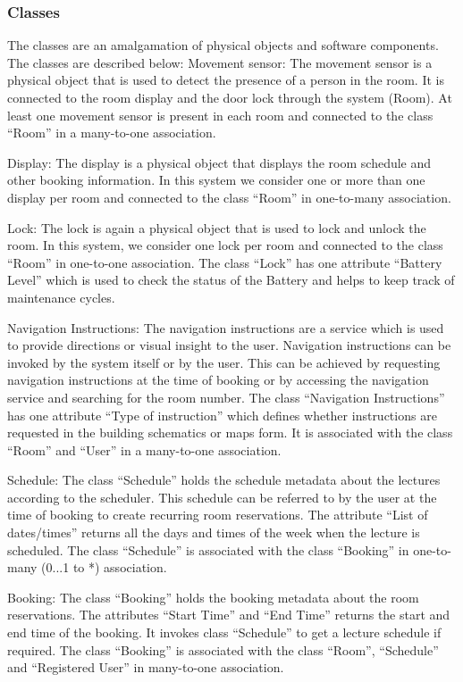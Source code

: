 \documentclass[conference,onecolumn]{IEEEtran}
\begin{document}
	\subsubsection*{Classes}
		The classes are an amalgamation of physical objects and software components. The classes are described below:
		Movement sensor: The movement sensor is a physical object that is used to detect the presence of a person in the room. It is connected to the room display and the door lock through the system (Room). At least one movement sensor is present in each room and connected to the class ``Room'' in a many-to-one association.
		
		Display: The display is a physical object that displays the room schedule and other booking information. In this system we consider one or more than one display per room and connected to the class ``Room'' in one-to-many association.

		Lock: The lock is again a physical object that is used to lock and unlock the room. In this system, we consider one lock per room and connected to the class ``Room'' in one-to-one association. The class ``Lock'' has one attribute ``Battery Level'' which is used to check the status of the Battery and helps to keep track of maintenance cycles.

		Navigation Instructions: The navigation instructions are a service which is used to provide directions or visual insight to the user. Navigation instructions can be invoked by the system itself or by the user. This can be achieved by requesting navigation instructions at the time of booking or by accessing the navigation service and searching for the room number. The class ``Navigation Instructions'' has one attribute ``Type of instruction'' which defines whether instructions are requested in the building schematics or maps form. It is associated with the class ``Room'' and ``User'' in a many-to-one association.

		Schedule: The class ``Schedule'' holds the schedule metadata about the lectures according to the scheduler. This schedule can be referred to by the user at the time of booking to create recurring room reservations. The attribute ``List of dates/times'' returns all the days and times of the week when the lecture is scheduled. The class ``Schedule'' is associated with the class ``Booking'' in one-to-many (0...1 to *) association.

		Booking: The class ``Booking'' holds the booking metadata about the room reservations. The attributes ``Start Time'' and ``End Time'' returns the start and end time of the booking. It invokes class ``Schedule'' to get a lecture schedule if required. The class ``Booking'' is associated with the class ``Room'', ``Schedule'' and ``Registered User'' in many-to-one association.
\end{document}
